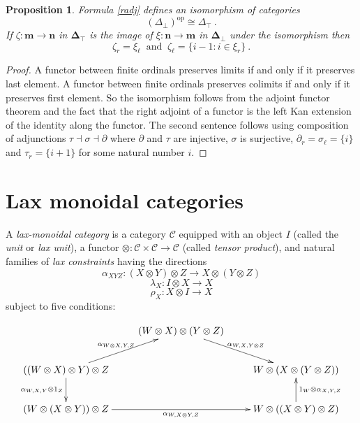\documentclass[a4paper,12pt,reqno]{amsart}
\newtheorem{proposition}[theorem]{Proposition}
\theoremstyle{definition}
\theoremstyle{fact}
\theoremstyle{genquest}
\theoremstyle{step}
\newcommand{\lra}{\longrightarrow}
\def\CC{{\mathscr C}}
\begin{document}
\begin{proposition}\label{bottop} 
Formula \eqref{radj} defines an isomorphism of categories
$$(\Delta_{\bot})^{\mathrm{op}} \cong \Delta_{\top} \ .$$ 
If $\zeta : \mathbf{m}\lra \mathbf{n}$ in $\mathbf{\Delta}_{\top}$ is
the image of $\xi : \mathbf{n}\lra \mathbf{m}$ in $\mathbf{\Delta}_{\bot}$ under the isomorphism then 
$$ \zeta_r = \xi_{\ell}  \ \text{  and  } \  \zeta_{\ell} = \{i-1 : i\in \xi_r \}  \ .$$ 
\end{proposition}
\begin{proof}
A functor between finite ordinals preserves limits if and only if it preserves last element.
A functor between finite ordinals preserves colimits if and only if it preserves first element.
So the isomorphism follows from the adjoint functor theorem and the fact that the right adjoint of a functor is the left Kan extension of the identity along the functor. 
The second sentence follows using composition of adjunctions $\tau \dashv \sigma \dashv \partial$
where $\partial$ and $\tau$ are injective, $\sigma$ is surjective, $\partial_r = \sigma_{\ell} = \{i\}$ and $\tau_r = \{i+1\}$
for some natural number $i$.      
\end{proof}

\section{Lax monoidal categories}

A {\em lax-monoidal category} is a category $\CC$ equipped with an object $I$ (called the {\em unit} or {\em lax unit}),
a functor $\otimes : \CC \times \CC \lra \CC$ (called {\em tensor product}), and
natural families of {\em lax constraints} having the directions 
\begin{equation}
\alpha_{XYZ} : (X\otimes Y)\otimes Z \lra X\otimes (Y\otimes Z)
\end{equation}
\begin{equation}
\lambda_X : I\otimes X \lra X
\end{equation}
\begin{equation}
\rho_X :  X\otimes I \lra X
\end{equation}
subject to five conditions: 

\begin{equation}\label{pentagon}
\xymatrix{
& (W\otimes X)\otimes (Y\otimes Z) \ar[rd]^-{{\alpha_{W,X,Y\otimes Z}}}  & \\
((W\otimes X)\otimes Y)\otimes Z \ar[ru]^-{{\alpha_{W\otimes X,Y,Z}}} \ar[d]_-{{\alpha_{W,X,Y}} \otimes 1_Z} & & W\otimes (X\otimes (Y\otimes Z))  \\
(W\otimes (X\otimes Y))\otimes Z \ar[rr]_-{{\alpha_{W,X\otimes Y,Z}}} & & W\otimes ((X\otimes Y)\otimes Z) \ar[u]_-{1_W\otimes {\alpha_{X, Y,Z}}} }
\end{equation}
\end{document}
